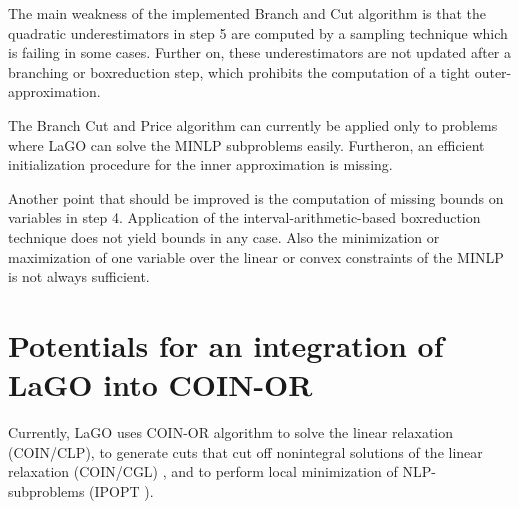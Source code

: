 \documentclass[11pt]{article}
\begin{document}
The main weakness of the implemented Branch and Cut algorithm is that the quadratic underestimators in step 5 are computed by a sampling technique which is failing in some cases.
Further on, these underestimators are not updated after a branching or boxreduction step, which prohibits the computation of a tight outer-approximation.

The Branch Cut and Price algorithm can currently be applied only to problems where LaGO can solve the MINLP subproblems easily.
Furtheron, an efficient initialization procedure for the inner approximation is missing.

Another point that should be improved is the computation of missing bounds on variables in step 4.
Application of the interval-arithmetic-based boxreduction technique does not yield bounds in any case.
Also the minimization or maximization of one variable over the linear or convex constraints of the MINLP is not always sufficient.

\section{Potentials for an integration of LaGO into COIN-OR}

Currently, LaGO uses COIN-OR algorithm to solve the linear relaxation (COIN/CLP), to generate cuts that cut off nonintegral solutions of the linear relaxation (COIN/CGL) \cite{GoLa05}, and to perform local minimization of NLP-subproblems (IPOPT \cite{WaBi06}).
\end{document}
